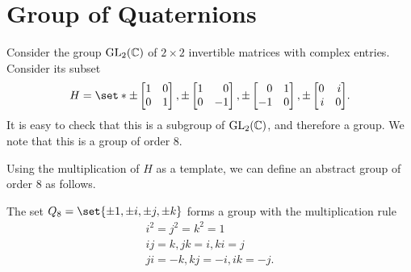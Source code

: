 \documentclass[11pt]{penrose}
\begin{document}
\section{Group of Quaternions}
Consider the group $\mathrm{GL}_2(\mathbb{C})$ of $2 \times 2$ invertible matrices with complex entries. Consider its subset
\begin{equation*}
    H = \set*{
    \pm\begin{bmatrix*}[r]1 & 0\\ 0 & 1\end{bmatrix*},
    \pm\begin{bmatrix*}[r]1 & 0\\ 0 &-1\end{bmatrix*},
    \pm\begin{bmatrix*}[r]0 & 1\\-1 & 0\end{bmatrix*},
    \pm\begin{bmatrix*}[r]0 & i\\ i & 0\end{bmatrix*} }.
\end{equation*}
It is easy to check that this is a subgroup of $\mathrm{GL}_2(\mathbb{C})$, and therefore a group. We note that this is a group of order $8$.

Using the multiplication of $H$ as a template, we can define an abstract group of order $8$ as follows.
\begin{nthm}
    The set $Q_8 = \set{\pm 1, \pm i, \pm j, \pm k}$ forms a group with the multiplication rule
    \begin{gather}
        i^2 = j^2 = k^2 = 1\\
        ij = k, jk = i, ki = j\\
        ji = -k, kj = -i, ik = -j.
    \end{gather}
\end{nthm}
\end{document}
